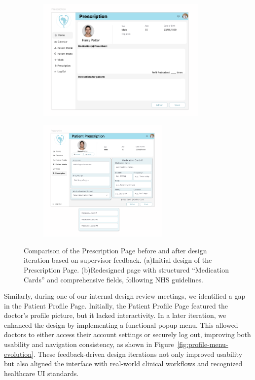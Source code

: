 \begin{figure}[htbp]
  \centering
  \captionsetup[subfigure]{labelformat=simple, labelsep=space, justification=centering}
  \renewcommand{\thesubfigure}{(\alph{subfigure})}
  \begin{subfigure}[t]{0.48\linewidth}
    \centering
    \includegraphics[height=6cm]{images03/3-2-2-figure5a.png}
    \caption{}
    \label{fig:prescription-before}
  \end{subfigure}\hfill
  \begin{subfigure}[t]{0.48\linewidth}
    \centering
    \includegraphics[height=6cm]{images03/3-2-2-figure5b.png}
    \caption{}
    \label{fig:prescription-after}
  \end{subfigure}
  \caption{Comparison of the Prescription Page before and after design iteration based on supervisor feedback. (a)Initial design of the Prescription Page. (b)Redesigned page with structured ``Medication Cards'' and comprehensive fields, following NHS guidelines.}
  \label{fig:prescription-evolution}
\end{figure}

Similarly, during one of our internal design review meetings, we identified a gap in the Patient Profile Page. Initially, the Patient Profile Page featured the doctor’s profile picture, but it lacked interactivity. In a later iteration, we enhanced the design by implementing a functional popup menu. This allowed doctors to either access their account settings or securely log out, improving both usability and navigation consistency, as shown in Figure~{\ref{fig:profile-menu-evolution}}. These feedback-driven design iterations not only improved usability but also aligned the interface with real-world clinical workflows and recognized healthcare UI standards.

